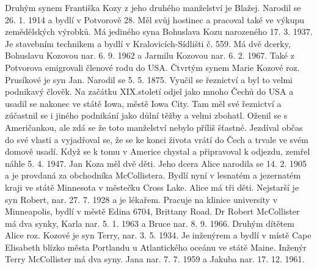 \documentclass[../dejiny-rodu-prusiku.tex]{subfiles}
\begin{document}
Druhým synem Františka Kozy z jeho druhého manželství je Blažej. Narodil se 26. 1. 1914 a bydlí v Potvorově 28. Měl svůj hostinec a pracoval také ve výkupu zemědělských výrobků. Má jediného syna Bohuslava Kozu narozeného 17. 3. 1937. Je stavebním technikem a bydlí v Kralovicích-Sídlišti č. 559. Má dvě dcerky, Bohuslavu Ko­zovou nar. 6. 9. 1962 a Jarmilu Kozovou nar. 6. 2. 1967. Také z Potvorova emigrovali členové rodu do USA. Čtvrtým synem Marie Kozové roz. Prusíkové je syn Jan. Narodil se 5. 5. 1875. Vyučil se řeznictví a byl to vel­mi podnikavý člověk. Na začátku XIX.století odjel jako mnoho Čechů do USA a usadil se nakonec ve státě Iowa, městě Iowa City. Tam měl své řeznictví a zúčastnil se i jiného podnikání jako důlní těžby a velmi zbohatl. Oženil se s Američankou, ale zdá se že toto manželství nebylo příliš šťastné. Jezdíval občas do své vlasti a vyjadřoval se, že se ke konci života vrátí do Čech a trvale ve svém domově usadí. Když se k tomu v Americe chystal a připravoval k odjezdu, zemřel náhle 5. 4. 1947. Jan Koza měl dvě děti. Jeho dcera Alice narodila se 14. 2. 1905 a je provdaná za obchodníka McCollistera. Bydlí nyní v lesnatém a jezernatém kraji ve státě Minne­sota v městečku Cross Lake. Alice má tři děti. Nejstarší je syn Robert, nar. 27. 7. 1928 a je lékařem. Pracuje na klinice university v Minneapolis, bydlí v městě Edina  6704, Brittany Road. Dr Robert McCollister má dva synky, Karla nar. 5. 1. 1963 a Bruce nar. 8. 9. 1966. Druhým dítětem Alice roz. Kozové je syn Terry, nar. 3. 5. 1934. Je inženýrem a bydlí v místě Cape Elisabeth blízko města Portlandu u Atlantického oceánu ve státě Maine. Inženýr Terry McCollister má dva syny. Jana nar. 7. 7. 1959 a Jakuba nar. 17. 12.  1961.
\end{document}
